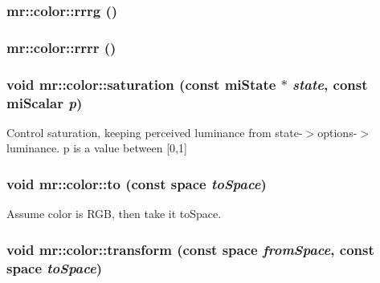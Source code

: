 \subsubsection{ mr::color::rrrg ()\hspace{0.3cm}{\tt  [inline]}}\label{structmr_1_1color_z7_93}


\subsubsection{ mr::color::rrrr ()\hspace{0.3cm}{\tt  [inline]}}\label{structmr_1_1color_z7_59}


\subsubsection{\setlength{\rightskip}{0pt plus 5cm}void mr::color::saturation (const mi\-State $\ast$ {\em state}, const mi\-Scalar {\em p})\hspace{0.3cm}{\tt  [inline]}}\label{structmr_1_1color_z16_2}


Control saturation, keeping perceived luminance from state-$>$options-$>$luminance. p is a value between [0,1] 
\subsubsection{\setlength{\rightskip}{0pt plus 5cm}void mr::color::to (const {\bf space} {\em to\-Space})\hspace{0.3cm}{\tt  [inline]}}\label{structmr_1_1color_z0_10}


Assume color is RGB, then take it to\-Space. 

\subsubsection{\setlength{\rightskip}{0pt plus 5cm}void mr::color::transform (const {\bf space} {\em from\-Space}, const {\bf space} {\em to\-Space})\hspace{0.3cm}{\tt  [inline]}}\label{structmr_1_1color_z0_12}


